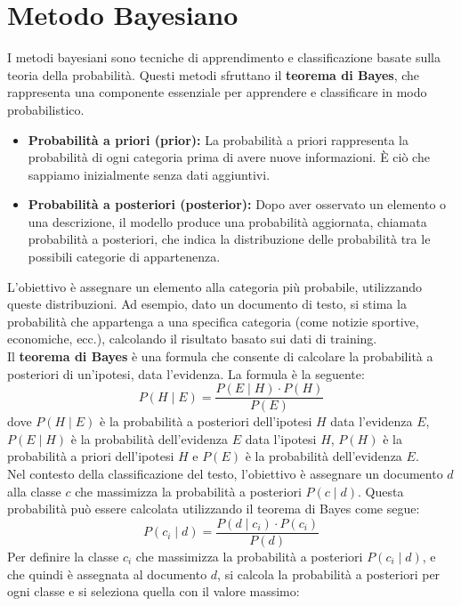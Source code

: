 \documentclass{report}
\begin{document}
	\section{Metodo Bayesiano}
	I metodi bayesiani sono tecniche di apprendimento e classificazione basate sulla teoria della probabilità. Questi metodi sfruttano il \textbf{teorema di Bayes}, che rappresenta una componente essenziale per apprendere e classificare in modo probabilistico.
	\begin{itemize}
		\item \textbf{Probabilità a priori (prior):}  
		La probabilità a priori rappresenta la probabilità di ogni categoria prima di avere nuove informazioni. È ciò che sappiamo inizialmente senza dati aggiuntivi.
		\item \textbf{Probabilità a posteriori (posterior):}  
		Dopo aver osservato un elemento o una descrizione, il modello produce una probabilità aggiornata, chiamata probabilità a posteriori, che indica la distribuzione delle probabilità tra le possibili categorie di appartenenza.
	\end{itemize}
	L'obiettivo è assegnare un elemento alla categoria più probabile, utilizzando queste distribuzioni. Ad esempio, dato un documento di testo, si stima la probabilità che appartenga a una specifica categoria (come notizie sportive, economiche, ecc.), calcolando il risultato basato sui dati di training.
	\vspace{\baselineskip}\\
	Il \textbf{teorema di Bayes} è una formula che consente di calcolare la probabilità a posteriori di un'ipotesi, data l'evidenza. La formula è la seguente:
	\[
	P(H \mid E) = \frac{P(E \mid H) \cdot P(H)}{P(E)}
	\]
	dove $P(H \mid E)$ è la probabilità a posteriori dell'ipotesi $H$ data l'evidenza $E$, $P(E \mid H)$ è la probabilità dell'evidenza $E$ data l'ipotesi $H$, $P(H)$ è la probabilità a priori dell'ipotesi $H$ e $P(E)$ è la probabilità dell'evidenza $E$.
	\vspace{\baselineskip}\\
	Nel contesto della classificazione del testo, l'obiettivo è assegnare un documento $d$ alla classe $c$ che massimizza la probabilità a posteriori $P(c \mid d)$. Questa probabilità può essere calcolata utilizzando il teorema di Bayes come segue:
	\[
	P(c_i \mid d) = \frac{P(d \mid c_i) \cdot P(c_i)}{P(d)}
	\]
	Per definire la classe $c_i$ che massimizza la probabilità a posteriori $P(c_i \mid d)$, e che quindi è assegnata al documento $d$, si calcola la probabilità a posteriori per ogni classe e si seleziona quella con il valore massimo:
\end{document}
